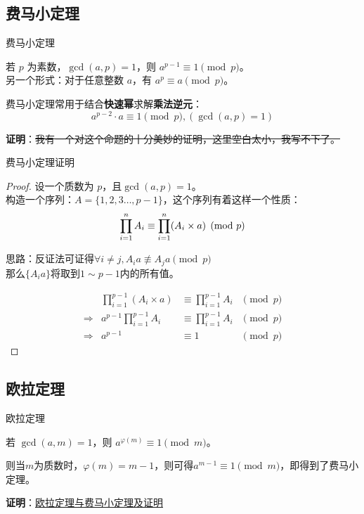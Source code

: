 \subsection{费马小定理}
\begin{frame}[fragile]{费马小定理}
  \begin{theorem}[费马小定理]
    若 $p$ 为素数，$\gcd(a, p) = 1$，则 $a^{p - 1} \equiv 1 \pmod{p}$。\\
    另一个形式：对于任意整数 $a$，有 $a^p \equiv a \pmod{p}$。
  \end{theorem}
  \pause 
  \vspace{0.5cm}

  费马小定理常用于结合\textbf{快速幂}求解\textbf{乘法逆元}：
  $$
  a^{p-2}\cdot a \equiv 1 \pmod{p}, (\gcd(a,p)=1)
  $$

  \pause
  \vspace{0.5cm}
  \textbf{证明}：\sout{我有一个对这个命题的十分美妙的证明，这里空白太小，我写不下了。}
\end{frame}

\begin{frame}[fragile]{费马小定理}{证明}
  \begin{proof}
    设一个质数为 $p$，且$\gcd(a,p)=1$。\\
    构造一个序列：$A=\{1,2,3\dots,p-1\}$，这个序列有着这样一个性质：
    $$
    \prod_{i=1}^{n}\space A_i\equiv\prod_{i=1}^{n} (A_i\times a) \pmod p
    $$
    
    \pause 
    思路：反证法可证得$\forall i\neq j,A_i a\not\equiv A_ja \pmod{p}$
    \\ 那么$\{A_ia\}$将取到$1\sim p-1$内的所有值。
    
    \pause 
    $$
    \begin{aligned}
      & \prod_{i=1}^{p-1}(A_i\times a) &\equiv\prod_{i=1}^{p-1} A_i &\pmod{p}\\
      \Rightarrow & a^{p-1}\prod_{i=1}^{p-1} A_i &\equiv\prod_{i=1}^{p-1} A_i &\pmod{p}\\
      \Rightarrow & a^{p-1} &\equiv 1 &\pmod{p}
    \end{aligned}
    $$
  \end{proof}
\end{frame}

\subsection{欧拉定理}
\begin{frame}[fragile]{欧拉定理}
  \begin{theorem}[欧拉定理]
    若 $\gcd(a, m) = 1$，则 $a^{\varphi(m)} \equiv 1 \pmod{m}$。
  \end{theorem}
  则当$m$为质数时，$\varphi(m)=m-1$，则可得$a^{m-1}\equiv 1 \pmod{m}$，即得到了费马小定理。
  
  \pause 
  \vspace{1.0cm}
  \textbf{证明}：\href{https://xdbirdie.github.io/2020/07/10/%E6%AC%A7%E6%8B%89%E5%AE%9A%E7%90%86%E4%B8%8E%E8%B4%B9%E9%A9%AC%E5%B0%8F%E5%AE%9A%E7%90%86/}{欧拉定理与费马小定理及证明}
\end{frame}

